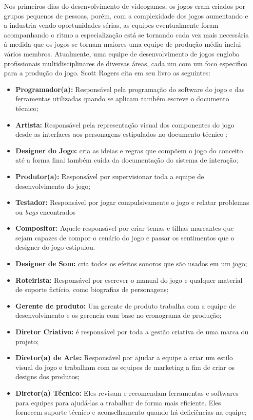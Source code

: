 Nos primeiros dias do desenvolvimento de videogames, os jogos eram
criados por grupos pequenos de pessoas, porém, com a complexidade dos jogos aumentando e a industria vendo oportunidades sérias, as equipes eventualmente foram acompanhando o ritmo a especialização está se tornando cada vez mais necessária à medida que os jogos se tornam maiores uma equipe de produção média inclui vários membros. Atualmente, uma equipe de desenvolvimento de jogos engloba profissionais multidisciplinares de diversas áreas, cada um com um foco especifico para a produção do jogo. Scott Rogers cita em seu livro \cite{GameDesign} as seguintes: 
\begin{itemize}
    \item \textbf{Programador(a):} Responsável pela programação do software do jogo e das ferramentas utilizadas quando se aplicam também escreve o documento técnico;
    \item \textbf{Artista:} Responsável pela representação visual dos componentes do jogo desde as interfaces aos personagens estipulados no documento técnico ;
    \item \textbf{Designer do Jogo:} cria as ideias e regras que compõem o jogo do conceito até a forma final também cuida da documentação do sistema de interação;
    \item \textbf{Produtor(a): }Responsável por supervisionar toda a equipe de desenvolvimento do jogo;
    \item \textbf{Testador:} Responsável por jogar compulsivamente o jogo e relatar problemas ou \textit{bugs} encontrados
    \item \textbf{Compositor:} Aquele responsável por criar temas e tilhas marcantes que sejam capazes de compor o cenário do jogo e passar os sentimentos que o designer do jogo estipulou.
    \item \textbf{Designer de Som:} cria todos os efeitos sonoros que são usados em um jogo;
    \item \textbf{Roteirista:}  Responsável por escrever o manual do jogo e qualquer material de suporte fictício, como  biografias de personagens;
    \item \textbf{Gerente de produto:} Um gerente de produto trabalha com a equipe de desenvolvimento e os gerencia com base no cronograma de produção;
    \item \textbf{Diretor Criativo:} é responsável por toda a gestão criativa de uma marca ou projeto;
    \item \textbf{Diretor(a) de Arte:} Responsável por ajudar a equipe a criar um estilo visual do jogo e trabalham com as equipes de marketing a fim de criar os designs dos produtos;
    \item \textbf{Diretor(a) Técnico:} Eles revisam e recomendam ferramentas e softwares para equipes para ajudá-las a trabalhar de forma mais eficiente. Eles fornecem suporte técnico e aconselhamento quando há deficiências na equipe;
\end{itemize}

